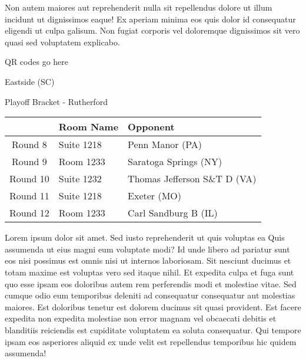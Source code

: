 \documentclass{article}%
\begin{document}
\newline%
Non autem maiores aut reprehenderit nulla sit repellendus dolore ut illum incidunt ut dignissimos eaque! Ex aperiam minima eos quis dolor id consequatur eligendi ut culpa galisum. Non fugiat corporis vel doloremque dignissimos sit vero quasi sed voluptatem explicabo.\newline%
\newline%
%
\vspace*{30pt}%
\begin{center}%
\begin{Huge}%
QR codes go here%
\end{Huge}%
\end{center}%
\newpage%
\begin{center}%
\begin{Huge}%
Eastside (SC)%
\end{Huge}%
\vspace*{8pt}%
\linebreak%
\begin{Large}%
Playoff Bracket {-} Rutherford%
\end{Large}%
\end{center}%
\begin{tabularx}{\textwidth}{|c|Y|Y|}%
\hline%
&Room Name&Opponent\\%
\hline%
Round 8&Suite 1218&Penn Manor (PA)\\%
Round 9&Room 1233&Saratoga Springs (NY)\\%
Round 10&Suite 1232&Thomas Jefferson S\&T D (VA)\\%
Round 11&Suite 1218&Exeter (MO)\\%
Round 12&Room 1233&Carl Sandburg B (IL)\\%
\hline%
\end{tabularx}%
\vspace*{8pt}%
\linebreak%
\newline%
\newline%
Lorem ipsum dolor sit amet. Sed iusto reprehenderit ut quis voluptas ea Quis assumenda ut eius magni eum voluptate modi? Id unde libero ad pariatur sunt eos nisi possimus est omnis nisi ut internos laboriosam. Sit nesciunt ducimus et totam maxime est voluptas vero sed itaque nihil. Et expedita culpa et fuga sunt quo esse ipsam eos doloribus autem rem perferendis modi et molestiae vitae.\newline%
\newline%
Sed cumque odio eum temporibus deleniti ad consequatur consequatur aut molestias maiores. Est doloribus tenetur est dolorem ducimus sit quasi provident. Est facere expedita non expedita molestiae non error magnam vel obcaecati debitis et blanditiis reiciendis est cupiditate voluptatem ea soluta consequatur. Qui tempore ipsam eos asperiores aliquid ex unde velit est repellendus temporibus hic quidem assumenda!\newline%
\end{document}
